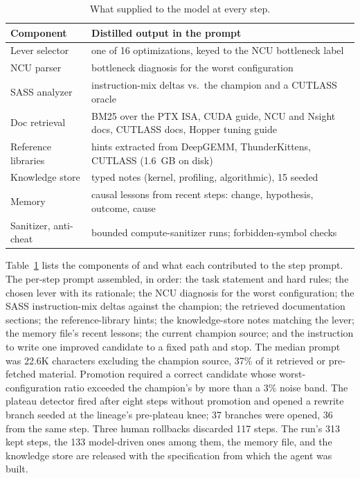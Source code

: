 \begin{table}[t]
\centering\small
\caption{What \baseline supplied to the model at every step.}
\label{tab:baseline}
\setlength{\tabcolsep}{4pt}
\begin{tabular}{@{}p{}p{}@{}}
\toprule
Component & Distilled output in the prompt \\
\midrule
Lever selector & one of 16 optimizations, keyed to the NCU bottleneck label \\
NCU parser & bottleneck diagnosis for the worst configuration \\
SASS analyzer & instruction-mix deltas vs.\ the champion and a CUTLASS oracle \\
Doc retrieval & BM25 over the PTX ISA, CUDA guide, NCU and Nsight docs, CUTLASS docs, Hopper tuning guide \\
Reference libraries & hints extracted from DeepGEMM, ThunderKittens, CUTLASS (1.6~GB on disk) \\
Knowledge store & typed notes (kernel, profiling, algorithmic), 15 seeded \\
Memory & causal lessons from recent steps: change, hypothesis, outcome, cause \\
Sanitizer, anti-cheat & bounded compute-sanitizer runs; forbidden-symbol checks \\
\bottomrule
\end{tabular}
\end{table}

Table~\ref{tab:baseline} lists the components of \baseline and what each contributed to the step
prompt. The per-step prompt assembled, in order: the task statement and hard rules; the chosen lever
with its rationale; the NCU diagnosis for the worst configuration; the SASS instruction-mix deltas
against the champion; the retrieved documentation sections; the reference-library hints; the
knowledge-store notes matching the lever; the memory file's recent lessons; the current champion
source; and the instruction to write one improved candidate to a fixed path and stop. The median
prompt was 22.6K characters excluding the champion source, 37\% of it retrieved or pre-fetched
material. Promotion required a correct candidate whose worst-configuration ratio exceeded the
champion's by more than a 3\% noise band. The plateau detector fired after eight steps without
promotion and opened a rewrite branch seeded at the lineage's pre-plateau knee; 37 branches were
opened, 36 from the same step. Three human rollbacks discarded 117 steps. The run's 313 kept steps,
the 133 model-driven ones among them, the memory file, and the knowledge store are released with
the specification from which the agent was built.

